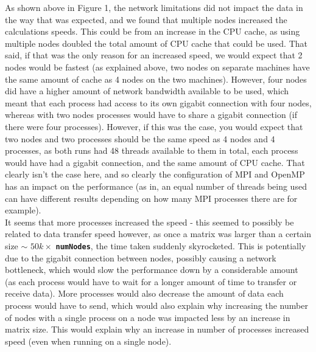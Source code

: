 \documentclass[11pt,leqno]{article}
\begin{document}
\begin{flushleft}
\pagebreak
As shown above in Figure 1, the network limitations did not impact the data in the way that was expected, and we found that multiple nodes increased the calculations speeds. This could be from an increase in the CPU cache, as using multiple nodes doubled the total amount of CPU cache that could be used. That said, if that was the only reason for an increased speed, we would expect that 2 nodes would be fastest (as explained above, two nodes on separate machines have the same amount of cache as 4 nodes on the two machines). However, four nodes did have a higher amount of network bandwidth available to be used, which meant that each process had access to its own gigabit connection with four nodes, whereas with two nodes processes would have to share a gigabit connection (if there were four processes). However, if this was the case, you would expect that two nodes and two processes should be the same speed as 4 nodes and 4 processes, as both runs had 48 threads available to them in total, each process would have had a gigabit connection, and the same amount of CPU cache. That clearly isn't the case here, and so clearly the configuration of MPI and OpenMP has an impact on the performance (as in, an equal number of threads being used can have different results depending on how many MPI processes there are for example).\\[2 ex]

It seems that more processes increased the speed - this seemed to possibly be related to data transfer speed however, as once a matrix was larger than a certain size $\sim$ $50k \times $ \textbf{\texttt{numNodes}}, the time taken suddenly skyrocketed. This is potentially due to the gigabit connection between nodes, possibly causing a  network bottleneck, which would slow the performance down by a considerable amount (as each process would have to wait for a longer amount of time to transfer or receive data). More processes would also decrease the amount of data each process would have to send, which would also explain why increasing the number of nodes with a single process on a node was impacted less by an increase in matrix size. This would explain why an increase in number of processes increased speed (even when running on a single node). \\[2 ex]
\end{flushleft}
\end{document}
